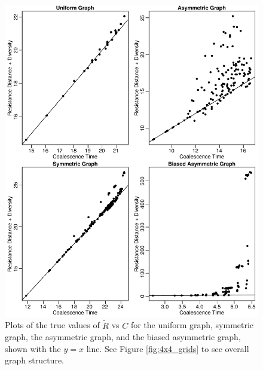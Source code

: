 \documentclass{article}
\newcommand{\comdist}{\widetilde{R}}
\newcommand{\plr}[1]{{\em \color{blue} #1}}
\begin{document}
\begin{figure}
\centering
     \includegraphics[scale=1]{figs/RvsC}
    \caption{Plots of the true values of $\comdist$ vs $C$ 
    for the uniform graph, symmetric graph, the asymmetric graph,
    and the biased asymmetric graph, 
    shown with the $y=x$ line.
    See Figure \ref{fig:4x4_grids} to see overall graph structure.}
    \label{fig:RvsC}
\end{figure}
\end{document}
